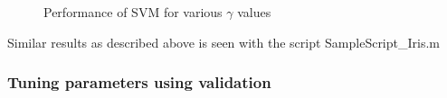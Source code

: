 \documentclass[12pt]{report}
\begin{document}
{\begin{figure}[!ht]
\begin{floatrow}
{ 		}{%
 			\caption{Performance of SVM for various $\gamma$ values}\label{table:3}
 		}
 	\end{floatrow}
 \end{figure}

Similar results as described above is seen with the script SampleScript\_Iris.m

\subsubsection{Tuning parameters using validation}
 \begin{figure}[!ht]
	\begin{floatrow}
\end{floatrow}
\end{figure}}
\end{document}
